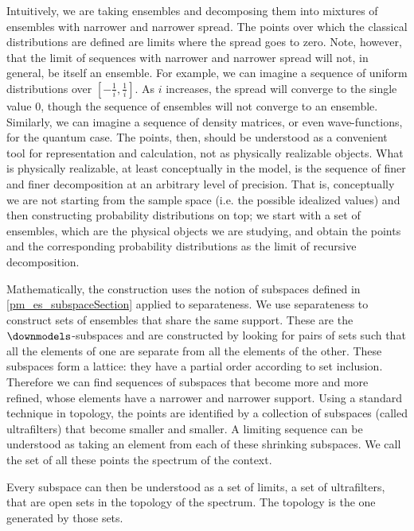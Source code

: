 Intuitively, we are taking ensembles and decomposing them into mixtures of ensembles with narrower and narrower spread. The points over which the classical distributions are defined are limits where the spread goes to zero. Note, however, that the limit of sequences with narrower and narrower spread will not, in general, be itself an ensemble. For example, we can imagine a sequence of uniform distributions over $[-\frac{1}{i}, \frac{1}{i}]$. As $i$ increases, the spread will converge to the single value $0$, though the sequence of ensembles will not converge to an ensemble. Similarly, we can imagine a sequence of density matrices, or even wave-functions, for the quantum case. The points, then, should be understood as a convenient tool for representation and calculation, not as physically realizable objects. What is physically realizable, at least conceptually in the model, is the sequence of finer and finer decomposition at an arbitrary level of precision. That is, conceptually we are not starting from the sample space (i.e. the possible idealized values) and then constructing probability distributions on top; we start with a set of ensembles, which are the physical objects we are studying, and obtain the points and the corresponding probability distributions as the limit of recursive decomposition.

Mathematically, the construction uses the notion of subspaces defined in \ref{pm_es_subspaceSection} applied to separateness. We use separateness to construct sets of ensembles that share the same support. These are the $\separate$-subspaces and are constructed by looking for pairs of sets such that all the elements of one are separate from all the elements of the other. These subspaces form a lattice: they have a partial order according to set inclusion. Therefore we can find sequences of subspaces that become more and more refined, whose elements have a narrower and narrower support. Using a standard technique in topology, the points are identified by a collection of subspaces (called ultrafilters) that become smaller and smaller. A limiting sequence can be understood as taking an element from each of these shrinking subspaces. We call the set of all these points the spectrum of the context.

Every subspace can then be understood as a set of limits, a set of ultrafilters, that are open sets in the topology of the spectrum. The topology is the one generated by those sets.

